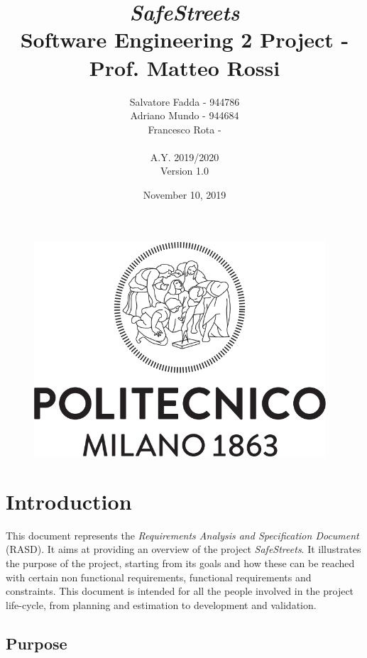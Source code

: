\documentclass {article}
\begin{document}
\begin{figure}
\centering
	\includegraphics[height=8cm]{polimi_logo.png}
\end{figure}


\title {{\Huge \it SafeStreets} \\ \Large Software Engineering 2 Project - Prof. Matteo Rossi}
\author{Salvatore Fadda - 944786\\Adriano Mundo - 944684 \\ Francesco Rota -
		\\ \\ A.Y. 2019/2020 \\ Version 1.0}
\date{November 10, 2019}



\maketitle
\newpage

	
\tableofcontents
\newpage


\section{Introduction}
This document represents the {\it Requirements Analysis and Specification Document} (RASD). It aims at providing an overview of the project {\it SafeStreets}. It illustrates the purpose of the project, starting from its goals and how these can be reached with certain non functional requirements, functional requirements and constraints. This document is intended for all the people involved in the project life-cycle, from planning and estimation to development and validation.

	
	\subsection{Purpose}
	
\end{document}

